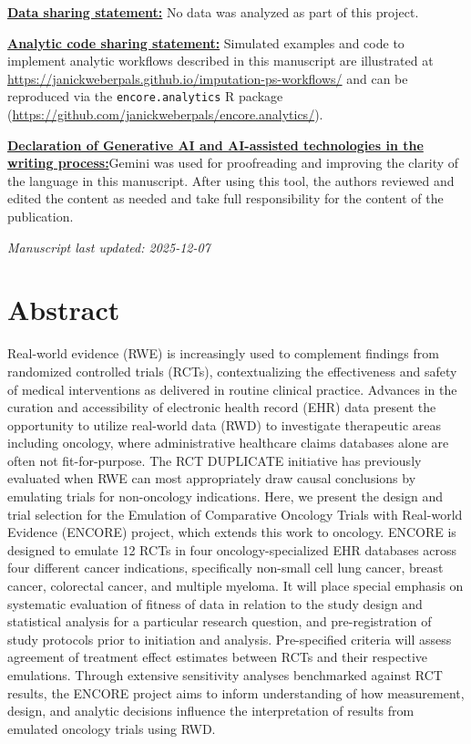 \documentclass[
  letterpaper,
  DIV=11,
  numbers=noendperiod]{scrartcl}
\begin{document}
\ul{\textbf{Data sharing statement:}} No data was analyzed as part of
this project.

\ul{\textbf{Analytic code sharing statement:}} Simulated examples and
code to implement analytic workflows described in this manuscript are
illustrated at
\url{https://janickweberpals.github.io/imputation-ps-workflows/} and can
be reproduced via the \texttt{encore.analytics} R package
(\url{https://github.com/janickweberpals/encore.analytics/}).

\ul{\textbf{Declaration of Generative AI and AI-assisted technologies in
the writing process:}}Gemini was used for proofreading and improving the
clarity of the language in this manuscript. After using this tool, the
authors reviewed and edited the content as needed and take full
responsibility for the content of the publication.

\emph{Manuscript last updated: 2025-12-07}

\newpage{}

\section*{Abstract}\label{abstract}

Real-world evidence (RWE) is increasingly used to complement findings
from randomized controlled trials (RCTs), contextualizing the
effectiveness and safety of medical interventions as delivered in
routine clinical practice. Advances in the curation and accessibility of
electronic health record (EHR) data present the opportunity to utilize
real-world data (RWD) to investigate therapeutic areas including
oncology, where administrative healthcare claims databases alone are
often not fit-for-purpose. The RCT DUPLICATE initiative has previously
evaluated when RWE can most appropriately draw causal conclusions by
emulating trials for non-oncology indications. Here, we present the
design and trial selection for the Emulation of Comparative Oncology
Trials with Real-world Evidence (ENCORE) project, which extends this
work to oncology. ENCORE is designed to emulate 12 RCTs in four
oncology-specialized EHR databases across four different cancer
indications, specifically non-small cell lung cancer, breast cancer,
colorectal cancer, and multiple myeloma. It will place special emphasis
on systematic evaluation of fitness of data in relation to the study
design and statistical analysis for a particular research question, and
pre-registration of study protocols prior to initiation and analysis.
Pre-specified criteria will assess agreement of treatment effect
estimates between RCTs and their respective emulations. Through
extensive sensitivity analyses benchmarked against RCT results, the
ENCORE project aims to inform understanding of how measurement, design,
and analytic decisions influence the interpretation of results from
emulated oncology trials using RWD.
\end{document}
